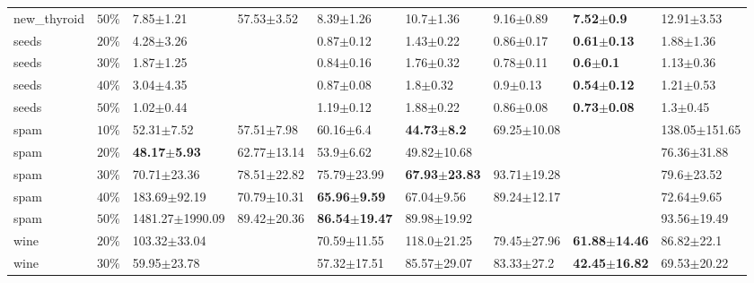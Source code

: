 \begin{tabular}{lllllllll}
  new_thyroid &     $ 50\% $ &           7.85$\pm$1.21 &  57.53$\pm$3.52 &            8.39$\pm$1.26 &            10.7$\pm$1.36 &   9.16$\pm$0.89 &    \textbf{7.52$\pm$0.9} &    12.91$\pm$3.53 \\
        seeds &     $ 20\% $ &           4.28$\pm$3.26 &                 &            0.87$\pm$0.12 &            1.43$\pm$0.22 &   0.86$\pm$0.17 &   \textbf{0.61$\pm$0.13} &     1.88$\pm$1.36 \\
        seeds &     $ 30\% $ &           1.87$\pm$1.25 &                 &            0.84$\pm$0.16 &            1.76$\pm$0.32 &   0.78$\pm$0.11 &     \textbf{0.6$\pm$0.1} &     1.13$\pm$0.36 \\
        seeds &     $ 40\% $ &           3.04$\pm$4.35 &                 &            0.87$\pm$0.08 &             1.8$\pm$0.32 &    0.9$\pm$0.13 &   \textbf{0.54$\pm$0.12} &     1.21$\pm$0.53 \\
        seeds &     $ 50\% $ &           1.02$\pm$0.44 &                 &            1.19$\pm$0.12 &            1.88$\pm$0.22 &   0.86$\pm$0.08 &   \textbf{0.73$\pm$0.08} &      1.3$\pm$0.45 \\
         spam &     $ 10\% $ &          52.31$\pm$7.52 &  57.51$\pm$7.98 &            60.16$\pm$6.4 &   \textbf{44.73$\pm$8.2} & 69.25$\pm$10.08 &                          & 138.05$\pm$151.65 \\
         spam &     $ 20\% $ & \textbf{48.17$\pm$5.93} & 62.77$\pm$13.14 &            53.9$\pm$6.62 &          49.82$\pm$10.68 &                 &                          &   76.36$\pm$31.88 \\
         spam &     $ 30\% $ &         70.71$\pm$23.36 & 78.51$\pm$22.82 &          75.79$\pm$23.99 & \textbf{67.93$\pm$23.83} & 93.71$\pm$19.28 &                          &    79.6$\pm$23.52 \\
         spam &     $ 40\% $ &        183.69$\pm$92.19 & 70.79$\pm$10.31 &  \textbf{65.96$\pm$9.59} &           67.04$\pm$9.56 & 89.24$\pm$12.17 &                          &    72.64$\pm$9.65 \\
         spam &     $ 50\% $ &     1481.27$\pm$1990.09 & 89.42$\pm$20.36 & \textbf{86.54$\pm$19.47} &          89.98$\pm$19.92 &                 &                          &   93.56$\pm$19.49 \\
         wine &     $ 20\% $ &        103.32$\pm$33.04 &                 &          70.59$\pm$11.55 &          118.0$\pm$21.25 & 79.45$\pm$27.96 & \textbf{61.88$\pm$14.46} &    86.82$\pm$22.1 \\
         wine &     $ 30\% $ &         59.95$\pm$23.78 &                 &          57.32$\pm$17.51 &          85.57$\pm$29.07 &  83.33$\pm$27.2 & \textbf{42.45$\pm$16.82} &   69.53$\pm$20.22 \\

\end{tabular}
